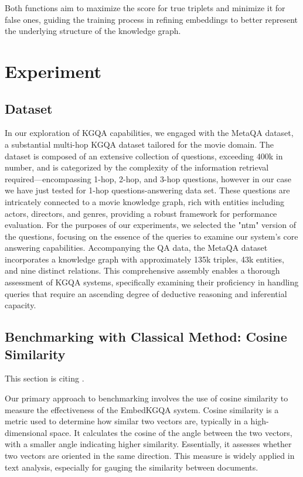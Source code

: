 \documentclass[12pt]{article}
\begin{document}
Both functions aim to maximize the score for true triplets and minimize it for false ones, guiding the training process in refining embeddings to better represent the underlying structure of the knowledge graph.


\section{Experiment}
\subsection{Dataset}
\sloppy
In our exploration of KGQA capabilities, we engaged with the MetaQA \parencite[]{zhang2017variational} dataset, a substantial multi-hop KGQA dataset tailored for the movie domain. The dataset is composed of an extensive collection of questions, exceeding 400k in number, and is categorized by the complexity of the information retrieval required—encompassing 1-hop, 2-hop, and 3-hop questions, however in our case we have just tested for 1-hop questions-answering data set. These questions are intricately connected to a movie knowledge graph, rich with entities including actors, directors, and genres, providing a robust framework for performance evaluation. 
\sloppy
For the purposes of our experiments, we selected the "ntm" version of the questions, focusing on the essence of the queries to examine our system’s core answering capabilities. Accompanying the QA data, the MetaQA dataset incorporates a knowledge graph with approximately 135k triples, 43k entities, and nine distinct relations. This comprehensive assembly enables a thorough assessment of KGQA systems, specifically examining their proficiency in handling queries that require an ascending degree of deductive reasoning and inferential capacity.

\subsection{Benchmarking with Classical Method: Cosine Similarity}
This section is citing \textcite{ganesan2024automated}.

Our primary approach to benchmarking involves the use of cosine similarity to measure the effectiveness of the EmbedKGQA system. Cosine similarity is a metric used to determine how similar two vectors are, typically in a high-dimensional space. It calculates the cosine of the angle between the two vectors, with a smaller angle indicating higher similarity. Essentially, it assesses whether two vectors are oriented in the same direction. This measure is widely applied in text analysis, especially for gauging the similarity between documents.
\end{document}
